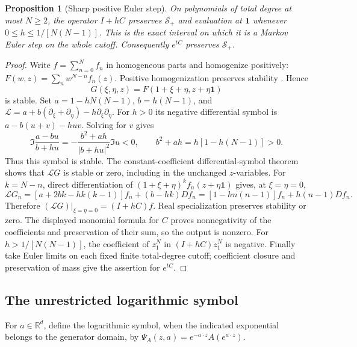 \documentclass[reqno]{amsart}
\newtheorem{proposition}[theorem]{Proposition}
\theoremstyle{definition}
\theoremstyle{remark}
\newcommand{\R}{\mathbb R}
\begin{document}
\begin{proposition}[Sharp positive Euler step]\label{pos:coal}
On polynomials of total degree at most \(N\ge2\), the operator \(I+hC\) preserves
\(\mathcal S_+\) and evaluation at \(\boldsymbol1\) whenever
\(0\le h\le1/[N(N-1)]\).  This is the exact interval on which it is a Markov Euler
step on the whole cutoff.  Consequently \(e^{tC}\) preserves \(\mathcal S_+\).
\end{proposition}
\begin{proof}
Write \(f=\sum_{n=0}^Nf_n\) in homogeneous parts and homogenize positively:
\(F(w,z)=\sum_nw^{N-n}f_n(z)\).  Positive homogenization preserves stability
\cite[Theorem 4.5]{BBL09}.  Hence
\[
 G(\xi,\eta,z)=F(1+\xi+\eta,z+\eta\boldsymbol1)
\]
is stable.  Set \(a=1-hN(N-1)\), \(b=h(N-1)\), and
\(\mathcal L=a+b(\partial_\xi+\partial_\eta)-h\partial_\xi\partial_\eta\).
For \(h>0\) its negative differential symbol is
\(a-b(u+v)-huv\).  Solving for \(v\) gives
\[
 \Im\frac{a-bu}{b+hu}
 =-\frac{b^2+ah}{|b+hu|^2}\Im u<0,
 \qquad b^2+ah=h[1-h(N-1)]>0.
\]
Thus this symbol is stable.  The constant-coefficient differential-symbol theorem
\cite{BB09,BB10} shows that \(\mathcal LG\) is stable or zero, including in the
unchanged \(z\)-variables.
For \(k=N-n\), direct differentiation of
\((1+\xi+\eta)^kf_n(z+\eta\boldsymbol1)\) gives, at \(\xi=\eta=0\),
\[
 \mathcal LG_n=
 [a+2bk-hk(k-1)]f_n+(b-hk)Df_n
 =[1-hn(n-1)]f_n+h(n-1)Df_n.
\]
Therefore \((\mathcal LG)|_{\xi=\eta=0}=(I+hC)f\).  Real specialization preserves
stability or zero.  The displayed monomial formula for \(C\) proves nonnegativity
of the coefficients and preservation of their sum, so the output is nonzero.
For \(h>1/[N(N-1)]\), the coefficient of \(z_1^N\) in \((I+hC)z_1^N\) is negative.
Finally take Euler limits on each fixed finite total-degree cutoff; coefficient
closure and preservation of mass give the assertion for \(e^{tC}\).
\end{proof}

\subsection{The unrestricted logarithmic symbol}

For \(a\in\R^d\), define the logarithmic symbol, when the indicated exponential
belongs to the generator domain, by
\(\Psi_A(z,a)=e^{-a\cdot z}A(e^{a\cdot z})\).
\end{document}
